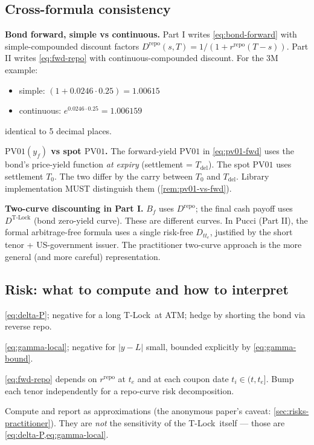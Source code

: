 \documentclass[11pt]{article}
\theoremstyle{definition}
\newcommand{\Tlock}{T-Lock}
\newcommand{\PVone}{\ensuremath{\mathrm{PV01}}}
\newcommand{\Drepo}{D^{\mathrm{repo}}}
\newcommand{\Dtl}{D^{\text{T-Lock}}}
\newcommand{\Tdel}{T_{\mathrm{del}}}
\newcommand{\Bf}{B_f}
\newcommand{\rrepo}{r^{\mathrm{repo}}}
\begin{document}
\subsection{Cross-formula consistency}

\textbf{Bond forward, simple vs continuous.}
Part I writes \cref{eq:bond-forward} with simple-compounded discount
factors $\Drepo(s,T) = 1/(1+\rrepo(T-s))$. Part II writes
\cref{eq:fwd-repo} with continuous-compounded discount.
For the 3M example:
\begin{itemize}[leftmargin=1.4em,itemsep=1pt]
\item simple: $(1 + 0.0246\cdot0.25) = 1.00615$
\item continuous: $e^{0.0246\cdot0.25} = 1.006159$
\end{itemize}
identical to 5 decimal places.

\textbf{$\PVone(y_f)$ vs spot $\PVone$.}
The forward-yield $\PVone$ in \cref{eq:pv01-fwd} uses the bond's
price-yield function \emph{at expiry} (settlement = $\Tdel$). The spot
$\PVone$ uses settlement $T_0$. The two differ by the carry between
$T_0$ and $\Tdel$. Library implementation MUST distinguish them
(\cref{rem:pv01-vs-fwd}).

\textbf{Two-curve discounting in Part I.}
$\Bf$ uses $\Drepo$; the final cash payoff uses $\Dtl$ (bond zero-yield
curve). These are different curves. In Pucci (Part II), the formal
arbitrage-free formula uses a single risk-free $D_{tt_e}$, justified by
the short tenor + US-government issuer. The practitioner two-curve
approach is the more general (and more careful) representation.

\subsection{Risk: what to compute and how to interpret}\label{sec:risk-impl}

\begin{description}[leftmargin=1.6em,itemsep=2pt]
\item[Delta vs forward price.] \cref{eq:delta-P}; negative for a long
      \Tlock\ at ATM; hedge by shorting the bond via reverse repo.
\item[Gamma vs forward price.] \cref{eq:gamma-local}; negative for
      $|y-L|$ small, bounded explicitly by \cref{eq:gamma-bound}.
\item[Repo bucket vega.] \cref{eq:fwd-repo} depends on $\rrepo$ at
      $t_e$ and at each coupon date $t_i\in(t,t_e]$. Bump each tenor
      independently for a repo-curve risk decomposition.
\item[PV01 / NDELTA of the underlier.] Compute and report
      as approximations (the anonymous paper's caveat:
      \cref{sec:risks-practitioner}). They are \emph{not} the
      sensitivity of the \Tlock\ itself --- those are
      \cref{eq:delta-P,eq:gamma-local}.
\end{description}
\end{document}
